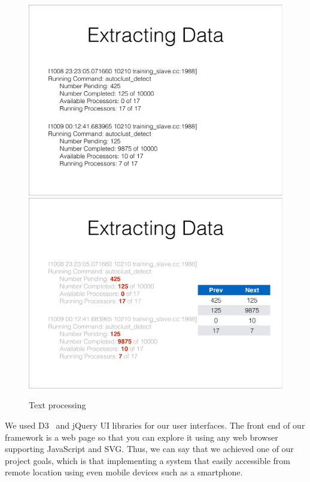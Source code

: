 \documentclass[conference]{style/acmsiggraph}
\begin{document}
\begin{figure}[p]
    \centering
    \includegraphics[width=1.0\columnwidth]{images/extracting_data_1.pdf}
    \includegraphics[width=1.0\columnwidth]{images/extracting_data_2.pdf}
    \caption{Text processing}
    \label{fig:extracting_data}
\end{figure}

We used D3~\cite{D311} and jQuery UI libraries for our user interfaces. The front end of our
framework is a web page so that you can explore it using any web browser supporting JavaScript and
SVG. Thus, we can say that we achieved one of our project goals, which is that implementing a system
that easily accessible from remote location using even mobile devices such as a smartphone.
\end{document}
